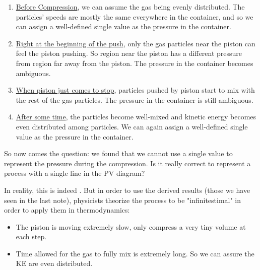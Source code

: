 \documentclass[class=article, crop=false, 12pt]{standalone}
\begin{document}
\begin{enumerate}
    \item \ul{Before Compression}, we can assume the gas being evenly distributed.
    The particles' speeds are mostly the same everywhere in the container,
    and so we can assign a well-defined single value as the pressure in the container.


    \item \ul{Right at the beginning of the push}, 
    only the gas particles near the piston can feel the piston pushing. 
    So region near the piston has a different pressure from region far away from the piston.
    The pressure in the container becomes ambiguous.


    \item \ul{When piston just comes to stop}, 
    particles pushed by piston start to mix with the rest of the gas particles.
    The pressure in the container is still ambiguous.


    \item \ul{After some time},
    the particles become well-mixed and kinetic energy becomes even distributed among particles.
    We can again assign a well-defined single value as the pressure in the container.


\end{enumerate}

So now comes the question: 
we found that we cannot use a single value to represent the pressure during the compression. 
Is it really correct to represent a process with a single line in the PV diagram?


In reality, this is indeed .
But in order to use the derived results (those we have seen in the last note),
physicists theorize the process to be "infinitestimal" in order to apply them in thermodynamics:
\begin{itemize}
    \item The piston is moving extremely slow,
    only compress a very tiny volume at each step.
    
    \item Time allowed for the gas to fully mix is extremely long. 
    So we can assure the KE are even distributed. 
\end{itemize}
\end{document}
